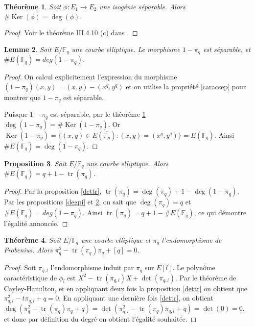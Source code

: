 \documentclass{article}
\theoremstyle{plain}%
\newtheorem{thm}{Théorème}[section]
\newtheorem{prop}[thm]{Proposition}
\newtheorem{lem}[thm]{Lemme}
\theoremstyle{definition}%
\newcommand{\F}{\mathbb{F}}
\DeclareMathOperator{\tr}{tr}
\DeclareMathOperator{\Ker}{Ker}
\begin{document}
\begin{thm}
  \label{cardinal_noyau}
  Soit $\phi:E_1\to E_2$ une isogénie séparable. Alors $\# \Ker(\phi) = \deg(\phi)$.  
\end{thm}

\begin{proof}
  Voir le théorème III.4.10 (c) dans \cite{Silverman}.
\end{proof}

\begin{lem}
  \label{cardpi}
  Soit $E/\F_q$ une courbe elliptique. Le morphisme $1-\pi_q$ est séparable, et $\#E(\F_q) = deg(1 - \pi_q)$.
\end{lem}

\begin{proof}
  On calcul explicitement l'expression du morphisme $(1-\pi_q)(x, y) = (x, y) - (x^q, y^q)$ et on utilise la propriété \ref{caracsep} pour montrer que $1-\pi_q$ est séparable.

  Puisque $1-\pi_q$ est séparable, par le théorème \ref{cardinal_noyau} $\deg(1-\pi_q) = \# \Ker(1-\pi_q)$. Or $\Ker(1-\pi_q) = \{(x, y) \in E(\overline{\F_p}) : (x, y) = (x^q, y^q) \} = E(\F_q)$. Ainsi $\# E(\F_q) = \deg(1-\pi_q)$.
\end{proof}

\begin{prop}
  \label{cardinalité}
  Soit $E/\F_q$ une courbe elliptique. Alors $\# E(\F_q) = q+1-\tr(\pi_q)$.
\end{prop}

\begin{proof}
  Par la proposition \ref{dettr}, $\tr(\pi_q) = \deg(\pi_q) + 1 - \deg(1-\pi_q)$. Par les propositions \ref{degpi} et \ref{cardpi}, on sait que $\deg(\pi_q) = q$ et $\#E(\F_q) = deg(1 - \pi_q)$. Ainsi $\tr(\pi_q) = q + 1 - \#E(\F_q)$, ce qui démontre l'égalité annoncée.
\end{proof}

\begin{thm}
  \label{polcarac}
  Soit $E/\F_q$ une courbe elliptique et $\pi_q$ l'endomorphisme de Frobenius. Alors $\pi_q^2 -\tr(\pi_q)\pi_q + [q] = 0$.
\end{thm}

\begin{proof}
  Soit $\pi_{q, l}$ l'endomorphisme induit par $\pi_q$ sur $E[l]$. Le polynôme caractéristique de $\phi_l$ est $X^2 -\tr(\pi_{q,l}) X + \det(\pi_{q, l})$. Par le théorème de Cayley-Hamilton, et en appliquant deux fois la proposition \ref{dettr} on obtient que $\pi_{q,l}^2 - t\pi_{q,l}+q = 0$. En appliquant une dernière fois \ref{dettr}, on obtient $\deg(\pi_{q}^2 - \tr(\pi_q)\pi_{q}+q ) = \det (\pi_{q,l}^2 - \tr(\pi_q)\pi_{q,l}+q ) = \det(0) = 0$, et donc par définition du degré on obtient l'égalité souhaitée.
\end{proof}
\end{document}
